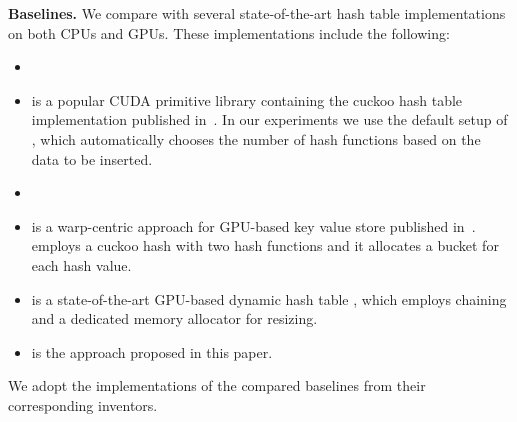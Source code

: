 \vspace{1mm}\noindent\textbf{Baselines.} We compare \voter with several state-of-the-art hash table implementations on both CPUs and GPUs. These implementations include the following:
\begin{itemize}
	\item {}
	\item \cudpp is a popular CUDA primitive library containing the cuckoo hash table implementation published in~\cite{alcantara2009real}.  
	In our experiments we use the default setup of \cudpp, which automatically chooses the number of hash functions based on the data to be inserted.
	\item {}
	\item \megakv is a warp-centric approach for GPU-based key value store published in~\cite{zhang2015mega}. \megakv employs a cuckoo hash with two hash functions and
	it allocates a bucket for each hash value. 
	\item \slab is a state-of-the-art GPU-based dynamic hash table \cite{ashkiani2018dynamic}, which employs chaining and a dedicated memory allocator for resizing.
	\item \voter is the approach proposed in this paper. 
\end{itemize}
We adopt the implementations of the compared baselines from their corresponding inventors.

